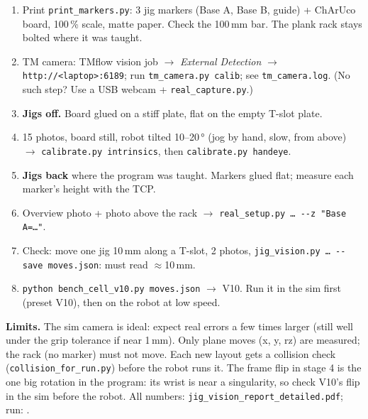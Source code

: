\documentclass[11pt,a4paper]{article}
\newcommand{\code}[1]{\texttt{\small #1}}
\newcommand{\step}[1]{\par\medskip{\large\textbf{\color{hdrblue}#1}}\par\smallskip}
\begin{document}
\newpage
\step{In the lab -- checklist}
\begin{enumerate}[leftmargin=6mm,itemsep=2pt]
\item Print \code{print\_markers.py}: 3 jig markers (Base A, Base B, guide) + ChArUco board, 100\,\% scale, matte
paper. Check the 100\,mm bar. The plank rack stays bolted where it was taught.
\item TM camera: TMflow vision job $\rightarrow$ \emph{External Detection} $\rightarrow$ \code{http://<laptop>:6189};
run \code{tm\_camera.py calib}; see \code{tm\_camera.log}. (No such step? Use a USB webcam + \code{real\_capture.py}.)
\item \textbf{Jigs off.} Board glued on a stiff plate, flat on the empty T-slot plate.
\item 15 photos, board still, robot tilted 10--20\,° (jog by hand, slow, from above) $\rightarrow$
\code{calibrate.py intrinsics}, then \code{calibrate.py handeye}.
\item \textbf{Jigs back} where the program was taught. Markers glued flat; measure each marker's height with the TCP.
\item Overview photo + photo above the rack $\rightarrow$ \code{real\_setup.py \dots{} -{}-z "Base A=\dots"}.
\item Check: move one jig 10\,mm along a T-slot, 2 photos, \code{jig\_vision.py \dots{} -{}-save moves.json}: must
read $\approx$10\,mm.
\item \code{python bench\_cell\_v10.py moves.json} $\rightarrow$ V10. Run it in the sim first (preset V10), then on the
robot at low speed.
\end{enumerate}

\medskip
\textbf{Limits.} The sim camera is ideal: expect real errors a few times larger (still well under the grip tolerance if
near 1\,mm). Only plane moves (x, y, rz) are measured; the rack (no marker) must not move.
Each new layout gets a collision check (\code{collision\_for\_run.py}) before the robot runs it. The frame flip in stage 4 is the one big rotation in the program:
its wrist is near a singularity, so check V10's flip in the sim before the robot.
All numbers: \code{jig\_vision\_report\_detailed.pdf}; run: \code{\wtRun}.
\end{document}
